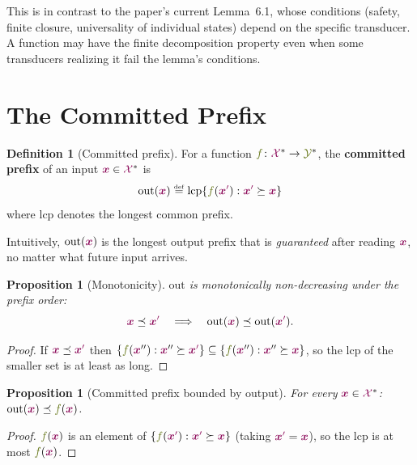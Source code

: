 \documentclass{article}
\newcommand{\defn}[1]{\textbf{#1}}
\newcommand{\defeq}{\mathrel{\overset{\raisebox{-0.25ex}{\textnormal{\tiny def}}}{=}}}
\newcommand{\set}[1]{\left\{ #1 \right\}}
\newcommand{\transFnSym}[0]{f}
\newcommand{\transFn}{\ensuremath{{\color{CharacterColor}\transFnSym}}\xspace}
\newcommand{\srcStr}{\ensuremath{{\color{TokenColor}\boldsymbol{x}}}\xspace}
\newcommand{\srcStrp}{\ensuremath{{\color{TokenColor}\boldsymbol{x}^\prime}}\xspace}
\newcommand{\srcAlphabet}[0]{{\color{TokenColor}\ensuremath{\mathcal{X}}}\xspace}
\newcommand{\tgtAlphabet}[0]{{\color{CharacterColor}\ensuremath{\mathcal{Y}}}\xspace}
\newcommand{\srcStrings}[0]{\ensuremath{\srcAlphabet^*}\xspace}
\newcommand{\tgtStrings}[0]{\ensuremath{\tgtAlphabet^*}\xspace}
\newcommand{\committed}{\mathrm{out}}
\newcommand{\lcp}{\mathrm{lcp}}
\theoremstyle{plain}
\newtheorem{proposition}[theorem]{Proposition}
\theoremstyle{definition}
\newtheorem{definition}[theorem]{Definition}
\theoremstyle{remark}
\begin{document}
This is in contrast to the paper's current Lemma~6.1, whose conditions (safety,
finite closure, universality of individual states) depend on the specific
transducer.  A function may have the finite decomposition property even when
some transducers realizing it fail the lemma's conditions.


\section{The Committed Prefix}
\label{sec:committed}

\begin{definition}[Committed prefix]
\label{def:committed}
For a function $\transFn \colon \srcStrings \to \tgtStrings$, the \defn{committed prefix} of an input $\srcStr \in \srcStrings$ is
\begin{equation}
  \committed(\srcStr) \defeq \lcp\!\set{\transFn(\srcStrp) : \srcStrp \succeq \srcStr}
\end{equation}
where $\lcp$ denotes the longest common prefix.
\end{definition}

Intuitively, $\committed(\srcStr)$ is the longest output prefix that is
\emph{guaranteed} after reading $\srcStr$, no matter what future input
arrives.

\begin{proposition}[Monotonicity]
\label{prop:committed-monotone}
$\committed$ is monotonically non-decreasing under the prefix order:
\[
  \srcStr \preceq \srcStrp
  \quad\Longrightarrow\quad
  \committed(\srcStr) \preceq \committed(\srcStrp).
\]
\end{proposition}
\begin{proof}
If $\srcStr \preceq \srcStrp$ then
$\{\transFn(\srcStr'') : \srcStr'' \succeq \srcStrp\} \subseteq
\{\transFn(\srcStr'') : \srcStr'' \succeq \srcStr\}$, so the lcp of the
smaller set is at least as long.
\end{proof}

\begin{proposition}[Committed prefix bounded by output]
\label{prop:committed-bound}
For every $\srcStr \in \srcStrings$:
$\committed(\srcStr) \preceq \transFn(\srcStr)$.
\end{proposition}
\begin{proof}
$\transFn(\srcStr)$ is an element of $\{\transFn(\srcStrp) : \srcStrp \succeq \srcStr\}$
(taking $\srcStrp = \srcStr$), so the lcp is at most $\transFn(\srcStr)$.
\end{proof}
\end{document}
